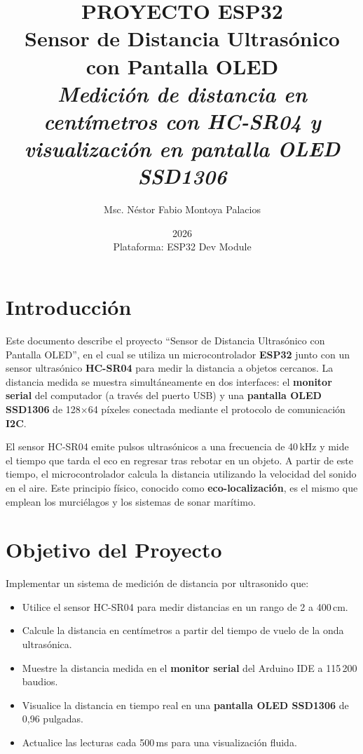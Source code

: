 \documentclass[12pt,a4paper]{article}
\title{\Huge\textbf{PROYECTO ESP32} \\ \Large Sensor de Distancia Ultrasónico con Pantalla OLED \\ \vspace{0.5cm} \normalsize \textit{Medición de distancia en centímetros con HC-SR04 y visualización en pantalla OLED SSD1306}}
\author{Msc. Néstor Fabio Montoya Palacios}
\date{2026 \\ \vspace{0.2cm} \small Plataforma: ESP32 Dev Module}
\begin{document}
\maketitle
\tableofcontents
\newpage

\section{Introducción}

Este documento describe el proyecto ``Sensor de Distancia Ultrasónico con Pantalla OLED'', en el cual se utiliza un microcontrolador \textbf{ESP32} junto con un sensor ultrasónico \textbf{HC-SR04} para medir la distancia a objetos cercanos. La distancia medida se muestra simultáneamente en dos interfaces: el \textbf{monitor serial} del computador (a través del puerto USB) y una \textbf{pantalla OLED SSD1306} de 128$\times$64 píxeles conectada mediante el protocolo de comunicación \textbf{I2C}.

El sensor HC-SR04 emite pulsos ultrasónicos a una frecuencia de 40\,kHz y mide el tiempo que tarda el eco en regresar tras rebotar en un objeto. A partir de este tiempo, el microcontrolador calcula la distancia utilizando la velocidad del sonido en el aire. Este principio físico, conocido como \textbf{eco-localización}, es el mismo que emplean los murciélagos y los sistemas de sonar marítimo.

\section{Objetivo del Proyecto}

Implementar un sistema de medición de distancia por ultrasonido que:
\begin{itemize}
    \item Utilice el sensor HC-SR04 para medir distancias en un rango de 2 a 400\,cm.
    \item Calcule la distancia en centímetros a partir del tiempo de vuelo de la onda ultrasónica.
    \item Muestre la distancia medida en el \textbf{monitor serial} del Arduino IDE a 115\,200 baudios.
    \item Visualice la distancia en tiempo real en una \textbf{pantalla OLED SSD1306} de 0,96 pulgadas.
    \item Actualice las lecturas cada 500\,ms para una visualización fluida.
\end{itemize}
\end{document}
